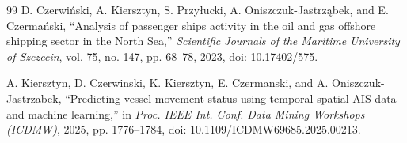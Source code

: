 \documentclass[conference]{IEEEtran}
\begin{document}
\begin{thebibliography}{99}
D. Czerwi{\'n}ski, A. Kiersztyn, S. Przy{\l}ucki, A. Oniszczuk-Jastrz{\k{a}}bek, and E. Czerma{\'n}ski,
``Analysis of passenger ships activity in the oil and gas offshore shipping sector in the North Sea,'' \emph{Scientific Journals of the Maritime University of Szczecin}, vol. 75, no. 147, pp. 68--78, 2023, doi: 10.17402/575.

A. Kiersztyn, D. Czerwinski, K. Kiersztyn, E. Czermanski, and A. Oniszczuk-Jastrzabek,
``Predicting vessel movement status using temporal-spatial AIS data and machine learning,'' in \emph{Proc. IEEE Int. Conf. Data Mining Workshops (ICDMW)}, 2025, pp. 1776--1784, doi: 10.1109/ICDMW69685.2025.00213.

\end{thebibliography}
\end{document}
